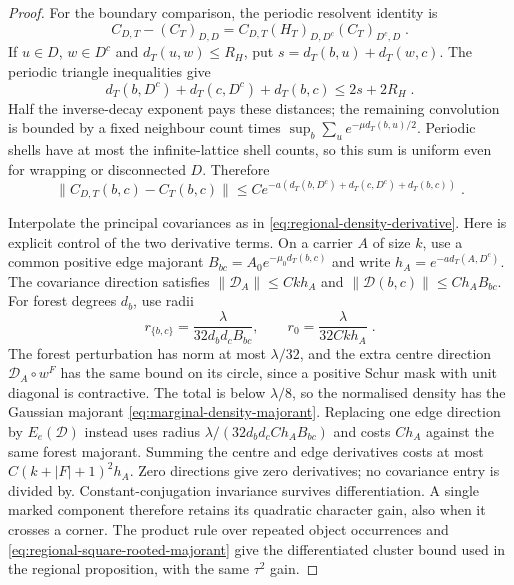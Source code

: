 \documentclass[11pt]{article}
\begin{document}
\begin{proof}
For the boundary comparison, the periodic resolvent identity is
\begin{equation}
    C_{D,T}-(C_T)_{D,D}
        =C_{D,T}(H_T)_{D,D^c}(C_T)_{D^c,D}\;.
\end{equation}
If $u\in D$, $w\in D^c$ and $d_T(u,w)\leq R_H$, put $s=d_T(b,u)+d_T(w,c)$. The periodic triangle inequalities give
\begin{equation}
    d_T(b,D^c)+d_T(c,D^c)+d_T(b,c)\leq2s+2R_H\;.
\end{equation}
Half the inverse-decay exponent pays these distances; the remaining convolution is bounded by a fixed neighbour count times $\sup_b\sum_u e^{-\mu d_T(b,u)/2}$. Periodic shells have at most the infinite-lattice shell counts, so this sum is uniform even for wrapping or disconnected $D$. Therefore
\begin{equation}
    \|C_{D,T}(b,c)-C_T(b,c)\|
        \leq Ce^{-a(d_T(b,D^c)+d_T(c,D^c)+d_T(b,c))}\;.
\end{equation}

Interpolate the principal covariances as in \eqref{eq:regional-density-derivative}. Here is explicit control of the two derivative terms. On a carrier $A$ of size $k$, use a common positive edge majorant $B_{bc}=A_0e^{-\mu_0d_T(b,c)}$ and write $h_A=e^{-a d_T(A,D^c)}$. The covariance direction satisfies $\|\mathcal D_A\|\leq Ckh_A$ and $\|\mathcal D(b,c)\|\leq Ch_AB_{bc}$. For forest degrees $d_b$, use radii
\begin{equation}
    r_{\{b,c\}}=\frac{\lambda}{32d_bd_cB_{bc}},
    \qquad r_0=\frac{\lambda}{32Ckh_A}\;.
\end{equation}
The forest perturbation has norm at most $\lambda/32$, and the extra centre direction $\mathcal D_A\circ w^F$ has the same bound on its circle, since a positive Schur mask with unit diagonal is contractive. The total is below $\lambda/8$, so the normalised density has the Gaussian majorant \eqref{eq:marginal-density-majorant}. Replacing one edge direction by $E_e(\mathcal D)$ instead uses radius $\lambda/(32d_bd_cCh_AB_{bc})$ and costs $Ch_A$ against the same forest majorant. Summing the centre and edge derivatives costs at most $C(k+|F|+1)^2h_A$. Zero directions give zero derivatives; no covariance entry is divided by. Constant-conjugation invariance survives differentiation. A single marked component therefore retains its quadratic character gain, also when it crosses a corner. The product rule over repeated object occurrences and \eqref{eq:regional-square-rooted-majorant} give the differentiated cluster bound used in the regional proposition, with the same $\tau^2$ gain.


\end{proof}
\end{document}

